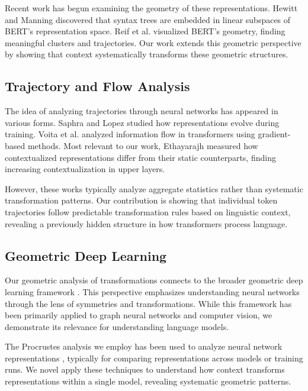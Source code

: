 Recent work has begun examining the geometry of these representations. Hewitt and Manning \cite{hewitt2019structural} discovered that syntax trees are embedded in linear subspaces of BERT's representation space. Reif et al. \cite{reif2019visualizing} visualized BERT's geometry, finding meaningful clusters and trajectories. Our work extends this geometric perspective by showing that context systematically transforms these geometric structures.

\subsection{Trajectory and Flow Analysis}

The idea of analyzing trajectories through neural networks has appeared in various forms. Saphra and Lopez \cite{saphra2019understanding} studied how representations evolve during training. Voita et al. \cite{voita2019bottom} analyzed information flow in transformers using gradient-based methods. Most relevant to our work, Ethayarajh \cite{ethayarajh2019contextual} measured how contextualized representations differ from their static counterparts, finding increasing contextualization in upper layers.

However, these works typically analyze aggregate statistics rather than systematic transformation patterns. Our contribution is showing that individual token trajectories follow predictable transformation rules based on linguistic context, revealing a previously hidden structure in how transformers process language.

\subsection{Geometric Deep Learning}

Our geometric analysis of transformations connects to the broader geometric deep learning framework \cite{bronstein2021geometric}. This perspective emphasizes understanding neural networks through the lens of symmetries and transformations. While this framework has been primarily applied to graph neural networks and computer vision, we demonstrate its relevance for understanding language models.

The Procrustes analysis we employ has been used to analyze neural network representations \cite{kornblith2019similarity, williams2021generalized}, typically for comparing representations across models or training runs. We novel apply these techniques to understand how context transforms representations within a single model, revealing systematic geometric patterns.

